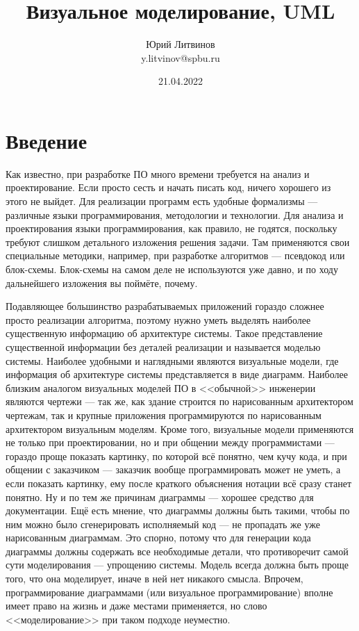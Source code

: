 \documentclass[a5paper]{article}
\title{Визуальное моделирование, UML}
\author{Юрий Литвинов\\\small{y.litvinov@spbu.ru}}
\date{21.04.2022}
\begin{document}
\maketitle
\thispagestyle{empty}

\section{Введение}

Как известно, при разработке ПО много времени требуется на анализ и проектирование. Если просто сесть и начать писать код, ничего хорошего из этого не выйдет. Для реализации программ есть удобные формализмы --- различные языки программирования, методологии и технологии. Для анализа и проектирования языки программирования, как правило, не годятся, поскольку требуют слишком детального изложения решения задачи. Там применяются свои специальные методики, например, при разработке алгоритмов --- псевдокод или блок-схемы. Блок-схемы на самом деле не используются уже давно, и по ходу дальнейшего изложения вы поймёте, почему.

Подавляющее большинство разрабатываемых приложений гораздо сложнее просто реализации алгоритма, поэтому нужно уметь выделять наиболее существенную информацию об архитектуре системы. Такое представление существенной информации без деталей реализации и называется моделью системы. Наиболее удобными и наглядными являются визуальные модели, где информация об архитектуре системы представляется в виде диаграмм. Наиболее близким аналогом визуальных моделей ПО в <<обычной>> инженерии являются чертежи --- так же, как здание строится по нарисованным архитектором чертежам, так и крупные приложения программируются по нарисованным архитектором визуальным моделям. Кроме того, визуальные модели применяются не только при проектировании, но и при общении между программистами --- гораздо проще показать картинку, по которой всё понятно, чем кучу кода, и при общении с заказчиком --- заказчик вообще программировать может не уметь, а если показать картинку, ему после краткого объяснения нотации всё сразу станет понятно. Ну и по тем же причинам диаграммы --- хорошее средство для документации. Ещё есть мнение, что диаграммы должны быть такими, чтобы по ним можно было сгенерировать исполняемый код --- не пропадать же уже нарисованным диаграммам. Это спорно, потому что для генерации кода диаграммы должны содержать все необходимые детали, что противоречит самой сути моделирования --- упрощению системы. Модель всегда должна быть проще того, что она моделирует, иначе в ней нет никакого смысла. Впрочем, программирование диаграммами (или визуальное программирование) вполне имеет право на жизнь и даже местами применяется, но слово <<моделирование>> при таком подходе неуместно.
\end{document}
